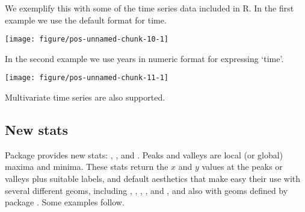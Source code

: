 \documentclass[paper=a4,10pt,div=17,headsepline,BCOR=12mm,twoside,open=right]{scrbook}\usepackage{knitr}
\begin{document}
We exemplify this with some of the time series data included in R. In the first example we use the default format for time.

\begin{knitrout}\footnotesize
{}\color{fgcolor}\begin{kframe}
\begin{alltt}
\hlstd{(}
        \hlopt{+}
  \hlstd{()}
\end{alltt}
\end{kframe}

{\centering \texttt{[image: figure/pos-unnamed-chunk-10-1]} 

}



\end{knitrout}

In the second example we use years in numeric format for expressing `time'.

\begin{knitrout}\footnotesize
{}\color{fgcolor}\begin{kframe}
\begin{alltt}
\hlstd{(} \hlstd{,}  \hlstd{=} \hlstd{),}
       \hlstd{(}    \hlopt{+}
  \hlstd{()}
\end{alltt}
\end{kframe}

{\centering \texttt{[image: figure/pos-unnamed-chunk-11-1]} 

}



\end{knitrout}

Multivariate time series are also supported.

\subsection{New stats}

Package \ggpmisc provides new stats: , , and . Peaks and valleys are local (or global) maxima and minima. These stats return the $x$ and $y$ values at the peaks or valleys plus suitable labels, and default aesthetics that make easy their use with several different geoms, including , , , ,  and , and also with geoms defined by package \ggrepel. Some examples follow.
\end{document}

